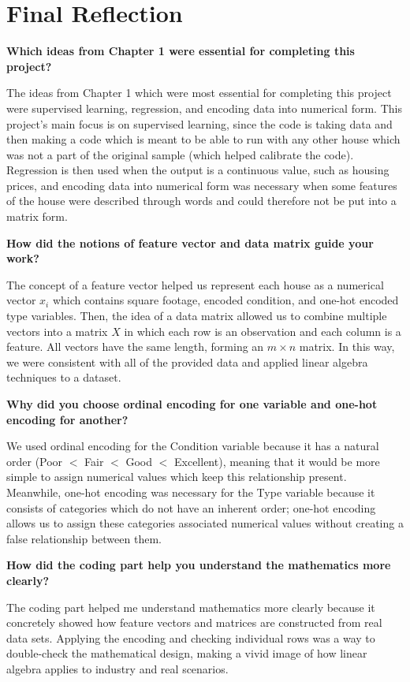 \documentclass[11pt]{article}
\begin{document}
\section{Final Reflection}

\textbf{Which ideas from Chapter 1 were essential for completing this project?}

The ideas from Chapter 1 which were most essential for completing this project were supervised learning, regression, and encoding data into numerical form. This project’s main focus is on supervised learning, since the code is taking data and then making a code which is meant to be able to run with any other house which was not a part of the original sample (which helped calibrate the code). Regression is then used when the output is a continuous value, such as housing prices, and encoding data into numerical form was necessary when some features of the house were described through words and could therefore not be put into a matrix form.

\textbf{How did the notions of feature vector and data matrix guide your work?}

The concept of a feature vector helped us represent each house as a numerical vector $x_i$ which contains square footage, encoded condition, and one-hot encoded type variables. Then, the idea of a data matrix allowed us to combine multiple vectors into a matrix $X$ in which each row is an observation and each column is a feature. All vectors have the same length, forming an $m \times n$ matrix. In this way, we were consistent with all of the provided data and applied linear algebra techniques to a dataset.

\textbf{Why did you choose ordinal encoding for one variable and one-hot encoding for another?}

We used ordinal encoding for the Condition variable because it has a natural order (Poor $<$ Fair $<$ Good $<$ Excellent), meaning that it would be more simple to assign numerical values which keep this relationship present. Meanwhile, one-hot encoding was necessary for the Type variable because it consists of categories which do not have an inherent order; one-hot encoding allows us to assign these categories associated numerical values without creating a false relationship between them.

\textbf{How did the coding part help you understand the mathematics more clearly?}

The coding part helped me understand mathematics more clearly because it concretely showed how feature vectors and matrices are constructed from real data sets. Applying the encoding and checking individual rows was a way to double-check the mathematical design, making a vivid image of how linear algebra applies to industry and real scenarios.
\end{document}

